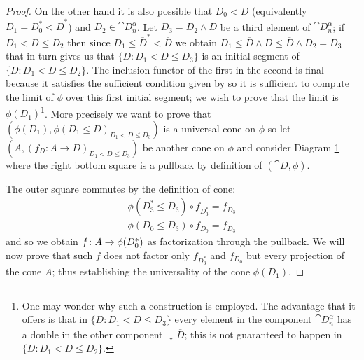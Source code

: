 \begin{proof}
  On the other hand it is also possible that \(D_0 < \overline{D}\) (equivalently \(D_1 = D_0^* < \overline{D}^*\)) and \(D_2\in\cat{D}_n^\alpha\). Let \(D_3 = D_2\land\overline{D}\) be a third element of \(\cat{D}_n^\alpha\); if \(D_1<D\leq D_2\) then since \(D_1\leq \overline{D}^*<\overline{D}\) we obtain \(D_1\leq\overline{D}\land D\leq\overline{D}\land D_2 = D_3\) that in turn gives us that \(\{D\colon D_1<D\leq D_3\}\) is an initial segment of \(\{D\colon D_1<D\leq D_2\}\). The inclusion functor of the first in the second is final because it satisfies the sufficient condition given by \cite[Proposition 2.11.2]{handbook1} so it is sufficient to compute the limit of \(\phi\) over this first initial segment; we wish to prove that the limit is \(\phi(D_1)\)\footnote{One may wonder why such a construction is employed. The advantage that it offers is that in \(\{D\colon D_1<D\leq D_3\}\) every element in the component \(\cat{D}_n^\alpha\) has a double in the other component \(\downarrow\overline{D}\); this is not guaranteed to happen in \(\{D\colon D_1<D\leq D_2\}\).}.
  More precisely we want to prove that \(\left(\phi(D_1), \phi(D_1\leq D)_{D_1< D\leq D_3}\right)\) is a universal cone on \(\phi\) so let \(\left(A, (f_D\colon A\to D)_{D_1<D\leq D_3}\right)\) be another cone on \(\phi\) and consider Diagram \ref{diagram:f_cone} where the right bottom square is a pullback by definition of \((\cat{D}, \phi)\).
  \begin{figure}[h]
    \begin{center}
    \end{center}
    \caption{}
    \label{diagram:f_cone}
  \end{figure}

  The outer square commutes by the definition of cone:
  \begin{align*}
    \phi(D_3^*\leq D_3)\circ f_{D_3^*} = f_{D_3}\\
    \phi(D_0\leq D_3)\circ f_{D_0} = f_{D_3}
  \end{align*}
  and so we obtain \(f\colon A\to \phi(D_0^*)\) as factorization through the pullback. We will now prove that such \(f\) does not factor only \(f_{D_3^*}\) and \(f_{D_0}\) but every projection of the cone \(A\); thus establishing the universality of the cone \(\phi(D_1)\).


\end{proof}
